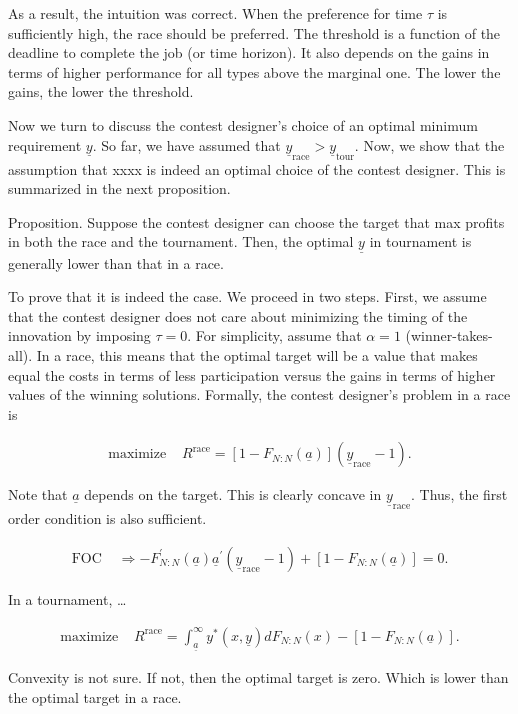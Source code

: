 \documentclass[12pt,]{article}
\theoremstyle{plain} %
\newcommand\target{\underline{y}}
\newcommand\race{\text{race}}
\newcommand\tournament{\text{tour}}
\newcommand\mtype{\underline{a}}
\begin{document}
As a result, the intuition was correct. When the preference for time
\(\tau\) is sufficiently high, the race should be preferred. The
threshold is a function of the deadline to complete the job (or time
horizon). It also depends on the gains in terms of higher performance
for all types above the marginal one. The lower the gains, the lower the
threshold.

Now we turn to discuss the contest designer's choice of an optimal
minimum requirement \(\target\). So far, we have assumed that
\(\target_\race>\target_\tournament\). Now, we show that the assumption
that xxxx is indeed an optimal choice of the contest designer. This is
summarized in the next proposition.

Proposition. Suppose the contest designer can choose the target that max
profits in both the race and the tournament. Then, the optimal
\(\target\) in tournament is generally lower than that in a race.

To prove that it is indeed the case. We proceed in two steps. First, we
assume that the contest designer does not care about minimizing the
timing of the innovation by imposing \(\tau = 0\). For simplicity,
assume that \(\alpha=1\) (winner-takes-all). In a race, this means that
the optimal target will be a value that makes equal the costs in terms
of less participation versus the gains in terms of higher values of the
winning solutions. Formally, the contest designer's problem in a race is

\begin{align}
  \text{maximize } & R^\race = [1-F_{N:N}(\mtype)] (\target_\race - 1).
\end{align}

Note that \(\mtype\) depends on the target. This is clearly concave in
\(\target_\race\). Thus, the first order condition is also sufficient.

\begin{align}\label{foc race}
  \text{FOC } & \Rightarrow -F^\prime_{N:N}(\mtype) \mtype^\prime (\target_\race - 1) + [1-F_{N:N}(\mtype)] = 0.
\end{align}

In a tournament, \ldots{}

\begin{align}
  \text{maximize } & R^\race = \int_{\mtype}^\infty y^*(x, \target) d F_{N:N}(x) - [1-F_{N:N}(\mtype)]. 
\end{align}

Convexity is not sure. If not, then the optimal target is zero. Which is
lower than the optimal target in a race.
\end{document}
